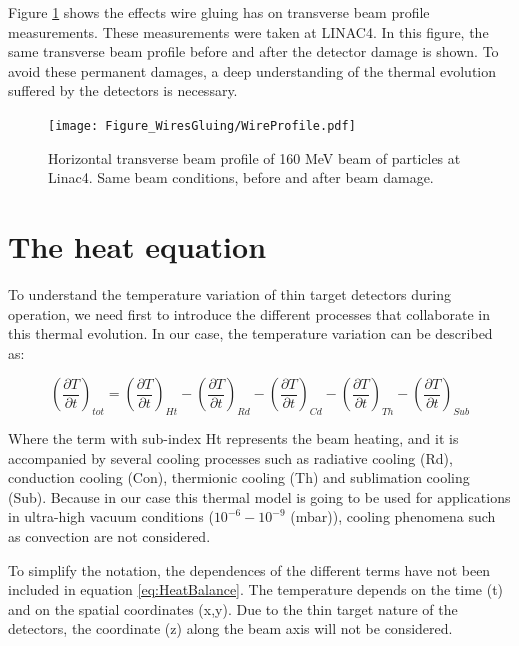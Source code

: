 Figure \ref{fig:WireGluing} shows the effects wire gluing has on transverse beam profile measurements. These measurements were taken at LINAC4. In this figure, the same transverse beam profile before and after the detector damage is shown. To avoid these permanent damages, a deep understanding of the thermal evolution suffered by the detectors is necessary. 

\begin{figure}[h]
    \centering
    \texttt{[image: Figure\_WiresGluing/WireProfile.pdf]}
    \caption{Horizontal transverse beam profile of 160 MeV beam of particles at Linac4. Same beam conditions, before and after beam damage. }
    \label{fig:WireGluing}
\end{figure}



\section{The heat equation}

To understand the temperature variation of thin target detectors during operation, we need first to introduce the different processes that collaborate in this thermal evolution. In our case, the temperature variation can be described as: 

\begin{equation}
    \left(\frac{\partial T}{\partial t}\right)_{tot} = \left(\frac{\partial T}{\partial t}\right)_{Ht} - \left(\frac{\partial T}{\partial t}\right)_{Rd} - 
                 \left(\frac{\partial T}{\partial t}\right)_{Cd} - \left(\frac{\partial T}{\partial t}\right)_{Th} - \left(\frac{\partial T}{\partial t}\right)_{Sub}
    \label{eq:HeatBalance}
\end{equation}

Where the term with sub-index Ht represents the beam heating, and it is accompanied by several cooling processes such as radiative cooling (Rd), conduction cooling (Con), thermionic cooling (Th) and sublimation cooling (Sub). Because in our case this thermal model is going to be used for applications in ultra-high vacuum conditions ($10^{-6} - 10^{-9}$ (mbar)), cooling phenomena such as convection are not considered. 

To simplify the notation, the dependences of the different terms have not been included in equation \ref{eq:HeatBalance}. The temperature depends on the time (t) and on the spatial coordinates (x,y). Due to the thin target nature of the detectors, the coordinate (z) along the beam axis will not be considered. 

